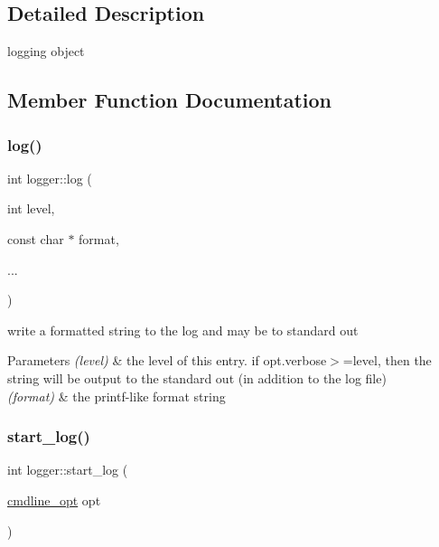 \subsection{Detailed Description}
logging object 

\subsection{Member Function Documentation}
\mbox{\label{structlogger_aa079e325d6f0279f803843acc2a8c6f5}} 
\subsubsection{\texorpdfstring{log()}{log()}}
{\footnotesize\ttfamily int logger\+::log (\begin{DoxyParamCaption}\item[{int}]{level,  }\item[{const char $\ast$}]{format,  }\item[{}]{... }\end{DoxyParamCaption})\hspace{0.3cm}{\ttfamily [inline]}}



write a formatted string to the log and may be to standard out 


\begin{DoxyParams}{Parameters}
{\em (level)} & the level of this entry. if opt.\+verbose$>$=level, then the string will be output to the standard out (in addition to the log file) \\
\hline
{\em (format)} & the printf-\/like format string \\
\hline
\end{DoxyParams}
\mbox{\label{structlogger_a2d852f1f257849e0abed587814446908}} 
\subsubsection{\texorpdfstring{start\+\_\+log()}{start\_log()}}
{\footnotesize\ttfamily int logger\+::start\+\_\+log (\begin{DoxyParamCaption}\item[{\hyperlink{structcmdline__opt}{cmdline\+\_\+opt}}]{opt }\end{DoxyParamCaption})\hspace{0.3cm}{\ttfamily [inline]}}



